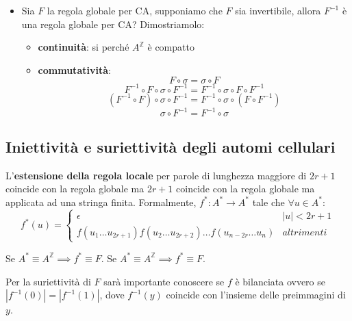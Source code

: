 \begin{itemize}
\begin{itemize}
          \end{itemize}
    \item Sia $F$ la regola globale per CA, supponiamo che $F$ sia invertibile,
          allora $F^{-1}$ è una regola globale per CA? Dimostriamolo:
          \begin{itemize}
              \item \textbf{continuità}: si perché $A^\mathbb{Z}$ è compatto
              \item \textbf{commutatività}: $$F\circ \sigma = \sigma \circ F $$
                    $$ F^{-1} \circ F\circ \sigma \circ F^{-1}= F^{-1}\circ \sigma \circ F \circ F^{-1}$$
                    $$ (F^{-1} \circ F)\circ \sigma \circ F^{-1}= F^{-1}\circ \sigma \circ (F \circ F^{-1})$$
                    $$ \sigma \circ F^{-1}= F^{-1}\circ \sigma$$
          \end{itemize}
\end{itemize}

\subsection{Iniettività e suriettività degli automi cellulari}

\begin{definizione} 
    L'\textbf{estensione della regola locale} per parole di lunghezza maggiore di
    $2r+1$ coincide con la regola globale ma
    $2r+1$ coincide con la regola globale ma
    applicata ad una stringa finita. Formalmente, $f^\ast: A^\ast\rightarrow A^\ast$
    tale che $\forall u\in A^\ast$:
    \begin{equation*}
        f^\ast(u) = \begin{cases}
            \epsilon                                                             & |u| < 2r+1 \\
            f(u_1\dots u_{2r+1})f(u_2\dots u_{2r+2})\dots f(u_{n-2r}\dots u_{n}) & altrimenti
        \end{cases}
    \end{equation*}
\end{definizione}

\begin{nota}
    Se $A^\ast\equiv A^\mathbb{Z}\implies f^\ast \equiv F$.
    Se $A^\ast\equiv A^\mathbb{Z}\implies f^\ast \equiv F$.
\end{nota}

\begin{nota}
    Per la suriettività di $F$ sarà importante conoscere se $f$ è bilanciata ovvero
    se $|f^{-1}(0)| =|f^{-1}(1)|$, dove $  f^{-1}(y)$ coincide con l'insieme delle
    preimmagini di $y$.
\end{nota}

